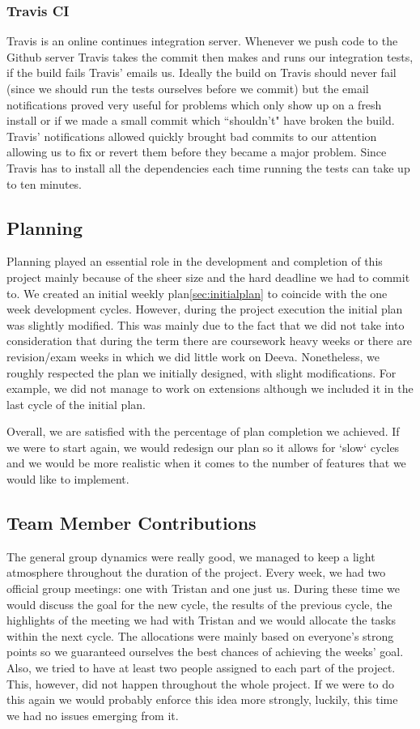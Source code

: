 \documentclass[11pt, a4paper]{article}
\begin{document}
\subsubsection{Travis CI}
Travis\cite{TravisCI} is an online continues integration server.
Whenever we push code to the Github server Travis takes the commit then makes and runs our integration tests, if the build fails Travis' emails us.
Ideally the build on Travis should never fail (since we should run the tests ourselves before we commit) but the email notifications proved very useful for problems which only show up on a fresh install or if we made a small commit which ``shouldn't" have broken the build.
Travis' notifications allowed quickly brought bad commits to our attention allowing us to fix or revert them before they became a major problem.
Since Travis has to install all the dependencies each time running the tests can take up to ten minutes.

\subsection{Planning}
Planning played an essential role in the development and completion of this project mainly because of the sheer size and the hard deadline we had to commit to.
We created an initial weekly plan\ref{sec:initialplan} to coincide with the one week development cycles.
However, during the project execution the initial plan was slightly modified.
This was mainly due to the fact that we did not take into consideration that during the term there are coursework heavy weeks or there are revision/exam weeks in which we did little work on Deeva.
Nonetheless, we roughly respected the plan we initially designed, with slight modifications.
For example, we did not manage to work on extensions although we included it in the last cycle of the initial plan.

Overall, we are satisfied with the percentage of plan completion we achieved.
If we were to start again, we would redesign our plan so it allows for `slow` cycles and we would be more realistic when it comes to the number of features that we would like to implement.

\subsection{Team Member Contributions}

The general group dynamics were really good, we managed to keep a light atmosphere throughout the duration of the project.
Every week, we had two official group meetings: one with Tristan and one just us.
During these time we would discuss the goal for the new cycle, the results of the previous cycle, the highlights of the meeting we had with Tristan and we would allocate the tasks within the next cycle.
The allocations were mainly based on everyone's strong points so we guaranteed ourselves the best chances of achieving the weeks' goal.
Also, we tried to have at least two people assigned to each part of the project.
This, however, did not happen throughout the whole project.
If we were to do this again we would probably enforce this idea more strongly, luckily, this time we had no issues emerging from it.
\end{document}
